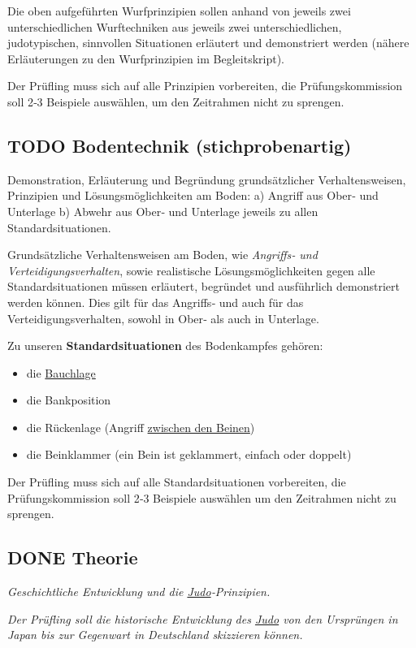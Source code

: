 \documentclass[11pt]{article}
\begin{document}
Die oben aufgeführten Wurfprinzipien sollen anhand von jeweils zwei unterschiedlichen Wurftechniken aus jeweils zwei unterschiedlichen, judotypischen, sinnvollen Situationen erläutert und demonstriert werden (nähere Erläuterungen zu den Wurfprinzipien im Begleitskript).

Der Prüfling muss sich auf alle Prinzipien vorbereiten, die Prüfungskommission soll 2‐3 Beispiele auswählen, um den Zeitrahmen nicht zu sprengen.

\subsection{{\bfseries\sffamily TODO} Bodentechnik (stichprobenartig)}
\label{sec:org2cba4d7}

Demonstration, Erläuterung und Begründung grundsätzlicher Verhaltensweisen, Prinzipien und Lösungsmöglichkeiten am Boden:
a) Angriff aus Ober‐ und Unterlage
b) Abwehr aus Ober‐ und Unterlage
jeweils zu allen Standardsituationen.

Grundsätzliche Verhaltensweisen am Boden, wie \emph{Angriffs‐ und Verteidigungsverhalten}, sowie realistische Lösungsmöglichkeiten gegen alle Standardsituationen müssen erläutert, begründet und ausführlich demonstriert werden können. Dies gilt für das Angriffs‐ und auch für das Verteidigungsverhalten, sowohl in Ober‐ als auch in
Unterlage. 

Zu unseren \textbf{Standardsituationen} des Bodenkampfes gehören:
\begin{itemize}
\item die \hyperref[orgf42100a]{Bauchlage}
\item die Bankposition
\item die Rückenlage (Angriff \hyperref[orgd3451e7]{zwischen den Beinen})
\item die Beinklammer (ein Bein ist geklammert, einfach oder doppelt)
\end{itemize}

Der Prüfling muss sich auf alle Standardsituationen vorbereiten, die Prüfungskommission soll 2‐3 Beispiele auswählen um den Zeitrahmen nicht zu sprengen.

\subsection{{\bfseries\sffamily DONE} Theorie}
\label{sec:orgdbd830f}
\emph{Geschichtliche Entwicklung und die \hyperref[org5f8b831]{Judo}‐Prinzipien.}

\emph{Der Prüfling soll die historische Entwicklung des \hyperref[org5f8b831]{Judo} von den Ursprüngen in Japan bis zur Gegenwart in Deutschland skizzieren können.}
\end{document}
